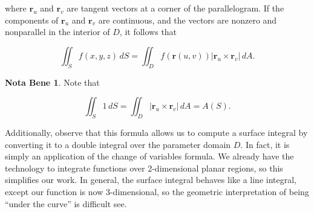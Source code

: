 \documentclass[11pt,oneside,english]{amsart}
\theoremstyle{definition}
\newtheorem*{note}{Nota Bene}
\begin{document}
where $\mathbf{r}_u$ and $\mathbf{r}_v$ are tangent vectors at a corner of the parallelogram. If the components of $\mathbf{r}_u$ and $\mathbf{r}_v$ are continuous, and the vectors are nonzero and nonparallel in the interior of $D$, it follows that

\[
\iint_Sf(x,y,z)\,dS=\iint_Df(\mathbf{r}(u,v))|\mathbf{r}_u\times\mathbf{r}_v|\,dA.
\]


\begin{note}
Note that

\[
\iint_S1\,dS=\iint_D|\mathbf{r}_u\times\mathbf{r}_v|\,dA=A(S).
\]

Additionally, observe that this formula allows us to compute a surface integral by converting it to a double integral over the parameter domain $D$. In fact, it is simply an application of the change of variables formula. We already have the technology to integrate functions over 2-dimensional planar regions, so this simplifies our work. In general, the surface integral behaves like a line integral, except our function is now 3-dimensional, so the geometric interpretation of being ``under the curve'' is difficult see.\end{note}
\end{document}
